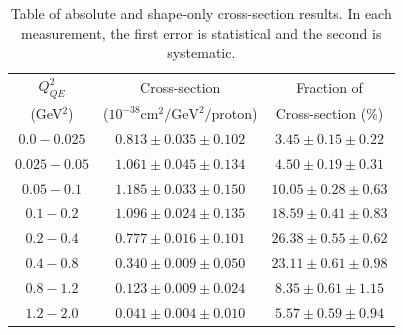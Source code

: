 \begingroup
\squeezetable
\begin{table}
\begin{tabular}{ccc}
$Q^2_{QE}$ & Cross-section  &  Fraction of \\
{\footnotesize (GeV$^2$) }    & {\footnotesize ($10^{-38}\mathrm{cm}^2/\mathrm{GeV}^2/$proton) } &  Cross-section {\footnotesize (\%)} \\ \hline
$0.0 - 0.025$ & $0.813\pm0.035\pm0.102$ &  $3.45\pm0.15\pm0.22$ \\ 
$0.025 - 0.05$ & $1.061\pm0.045\pm0.134$ &  $4.50\pm0.19\pm0.31$ \\ 
$0.05 - 0.1$ & $1.185\pm0.033\pm0.150$ &  $10.05\pm0.28\pm0.63$ \\ 
$0.1 - 0.2$ & $1.096\pm0.024\pm0.135$ &  $18.59\pm0.41\pm0.83$ \\ 
$0.2 - 0.4$ & $0.777\pm0.016\pm0.101$ &  $26.38\pm0.55\pm0.62$ \\ 
$0.4 - 0.8$ & $0.340\pm0.009\pm0.050$ &  $23.11\pm0.61\pm0.98$ \\ 
$0.8 - 1.2$ & $0.123\pm0.009\pm0.024$ &  $8.35\pm0.61\pm1.15$ \\ 
$1.2 - 2.0$ & $0.041\pm0.004\pm0.010$ &  $5.57\pm0.59\pm0.94$ \\ 
\hline
\end{tabular}
\caption{Table of absolute and shape-only cross-section results.  In each measurement, the first error is statistical and the second is systematic.}
\label{tab:xsec}
\end{table}
\endgroup
